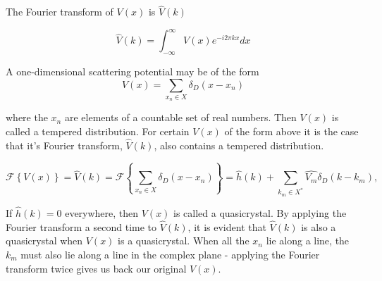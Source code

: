 \documentclass[11pt, oneside]{article}   	%
\begin{document}
The Fourier transform of $V(x)$ is $\hat{V}(k)$ 

\begin{equation}
\hat{V}(k) = \int_{-\infty}^{\infty}V(x)e^{-i2\pi kx}dx
\end{equation}

A one-dimensional scattering potential may be of the form 
\begin{equation}
V(x) = \sum_{x_n \in X}\delta_D(x - x_n)
\end{equation} 
 
where the $x_n$ are elements of a countable set of real numbers. 
Then $V(x)$ is called a tempered distribution.
 For certain $V(x)$ of the form above it is the case that it's Fourier transform, $\hat{V}(k)$, also contains a tempered distribution. 
  
\begin{equation}
 \label{eq: RiemannFourier}
 \mathcal{F}\left \{V(x)\right \} = \hat{V}(k) = \mathcal{F}\left \{ \sum_{x_n \in X}\delta_D(x - x_n) \right \} = \hat{h}(k) +  \sum_{k_m \in X^{*}} \hat{V_{m}} \delta_D(k - k_{m}),
\end{equation}

If $\hat{h}(k) = 0$ everywhere, then $V(x)$ is called a quasicrystal.
By applying the Fourier transform a second time to $\hat{V}(k)$, it is evident that $\hat{V}(k)$ is also a quasicrystal when $V(x)$ is a quasicrystal. When all the $x_n$ lie along a line, the $k_m$ must also lie along a line in the complex plane - applying the Fourier transform twice gives us back our original $V(x)$.









\end{document}
